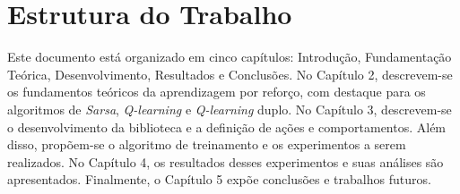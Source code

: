 \section{Estrutura do Trabalho}
\par Este documento está organizado em cinco capítulos: Introdução, Fundamentação Teórica, Desenvolvimento, Resultados e Conclusões. No Capítulo 2, descrevem-se os fundamentos teóricos da aprendizagem por reforço, com destaque para os algoritmos de \textit{Sarsa}, \textit{Q-learning} e \textit{Q-learning} duplo. No Capítulo 3, descrevem-se o desenvolvimento da biblioteca e a definição de ações e comportamentos. Além disso, propõem-se o algoritmo de treinamento e os experimentos a serem realizados. No Capítulo 4, os resultados desses experimentos e suas análises são apresentados. Finalmente, o Capítulo 5 expõe conclusões e trabalhos futuros.

